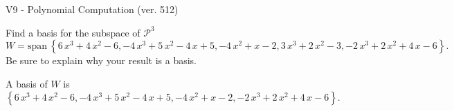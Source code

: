 \begin{exercise}
  \begin{exerciseTitle}V9 - Polynomial Computation (ver. 512)\end{exerciseTitle}
  \begin{exerciseStatement}
    Find a basis for the subspace of \(\mathcal{P}^3\) 
\[W=\mathrm{span}\ \left\{6 \, x^{3} + 4 \, x^{2} - 6 , -4 \, x^{3} + 5 \, x^{2} - 4 \, x + 5 , -4 \, x^{2} + x - 2 , 3 \, x^{3} + 2 \, x^{2} - 3 , -2 \, x^{3} + 2 \, x^{2} + 4 \, x - 6\right\}.\]
 Be sure to explain why your result is a basis.


  \end{exerciseStatement}
  \begin{exerciseAnswer}
   A basis of \(W\) is  \(\left\{6 \, x^{3} + 4 \, x^{2} - 6 , -4 \, x^{3} + 5 \, x^{2} - 4 \, x + 5 , -4 \, x^{2} + x - 2 , -2 \, x^{3} + 2 \, x^{2} + 4 \, x - 6\right\}\).
  


  \end{exerciseAnswer}
\end{exercise}